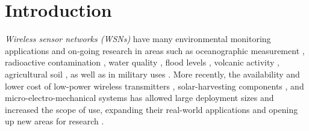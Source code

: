 \section{Introduction}

\textit{Wireless sensor networks (WSNs)} have many environmental monitoring applications and on-going research in areas such as oceanographic measurement \citep{Mahdy2008a, Albaladejo2010, 6973877}, radioactive contamination \citep{Gomez2015}, water quality \citep{Fang2010}, flood levels \citep{Castillo2004}, volcanic activity \citep{Werner-Allen2006}, agricultural soil \citep{8745854}, as well as in military uses \citep{6268958}. More recently, the availability and lower cost of low-power wireless transmitters \citep{902661}, solar-harvesting components \citep{Prauzek2018}, and micro-electro-mechanical systems \citep{1045391} has allowed large deployment sizes and increased the scope of use, expanding their real-world applications and opening up new areas for research \citep{5597912, Kandris2020}.

